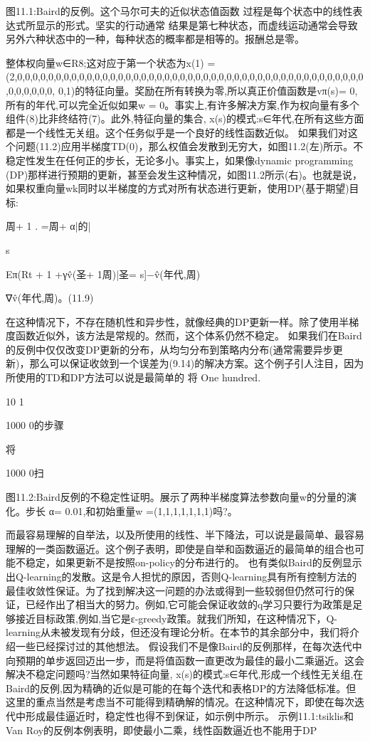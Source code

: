 图11.1:Baird的反例。这个马尔可夫的近似状态值函数
过程是每个状态中的线性表达式所显示的形式。坚实的行动通常
结果是第七种状态，而虚线运动通常会导致另外六种状态中的一种，每种状态的概率都是相等的。报酬总是零。

整体权向量w∈R8;这对应于第一个状态为x(1) =(2,0,0,0,0,0,0,0,0,0,0,0,0,0,0,0,0,0,0,0,0,0,0,0,0,0,0,0,0,0,0,0,0,0,0,0,0,0,0,0,0,0,0,0,0,0,0,0,0,0,0,0, 0,1)的特征向量。奖励在所有转换为零,所以真正价值函数是vπ(s)= 0,所有的年代,可以完全近似如果w = 0。事实上,有许多解决方案,作为权向量有多个组件(8)比非终结符(7)。此外,特征向量的集合,{ x(s)的模式:s∈年代},在所有这些方面都是一个线性无关组。这个任务似乎是一个良好的线性函数近似。
如果我们对这个问题(11.2)应用半梯度TD(0)，那么权值会发散到无穷大，如图11.2(左)所示。不稳定性发生在任何正的步长，无论多小。事实上，如果像dynamic programming (DP)那样进行预期的更新，甚至会发生这种情况，如图11.2所示(右)。也就是说，如果权重向量wk同时以半梯度的方式对所有状态进行更新，使用DP(基于期望)目标:

周+ 1
.
=周+
α|的|

s

Eπ(Rt + 1 +γv̂(圣+ 1周)|圣= s]−v̂(年代,周)

∇v̂(年代,周)。(11.9)

在这种情况下，不存在随机性和异步性，就像经典的DP更新一样。除了使用半梯度函数近似外，该方法是常规的。然而，这个体系仍然不稳定。
如果我们在Baird的反例中仅仅改变DP更新的分布，从均匀分布到策略内分布(通常需要异步更新)，那么可以保证收敛到一个误差为(9.14)的解决方案。这个例子引人注目，因为所使用的TD和DP方法可以说是最简单的
将
One hundred.




10 1

1000 0的步骤
 
将




1000 0扫

图11.2:Baird反例的不稳定性证明。展示了两种半梯度算法参数向量w的分量的演化。步长
α= 0.01,和初始重量w =(1,1,1,1,1,1,1)吗?。

而最容易理解的自举法，以及所使用的线性、半下降法，可以说是最简单、最容易理解的一类函数逼近。这个例子表明，即使是自举和函数逼近的最简单的组合也可能不稳定，如果更新不是按照on-policy的分布进行的。
也有类似Baird的反例显示出Q-learning的发散。这是令人担忧的原因，否则Q-learning具有所有控制方法的最佳收敛性保证。为了找到解决这一问题的办法或得到一些较弱但仍然可行的保证，已经作出了相当大的努力。例如,它可能会保证收敛的q学习只要行为政策是足够接近目标政策,例如,当它是ε-greedy政策。就我们所知，在这种情况下，Q-learning从未被发现有分歧，但还没有理论分析。在本节的其余部分中，我们将介绍一些已经探讨过的其他想法。
假设我们不是像Baird的反例那样，在每次迭代中向预期的单步返回迈出一步，而是将值函数一直更改为最佳的最小二乘逼近。这会解决不稳定问题吗?当然如果特征向量,{ x(s)的模式:s∈年代},形成一个线性无关组,在Baird的反例,因为精确的近似是可能的在每个迭代和表格DP的方法降低标准。但这里的重点当然是考虑当不可能得到精确解的情况。在这种情况下，即使在每次迭代中形成最佳逼近时，稳定性也得不到保证，如示例中所示。
示例11.1:tsiklis和Van Roy的反例本例表明，即使最小二乘，线性函数逼近也不能用于DP


